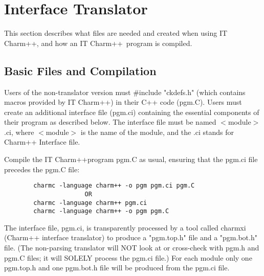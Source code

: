 \newcommand{\ITC}{Interface Translator} 
\newcommand{\itc}{IT Charm++} 

\newcommand{\BE}{\begin{enumerate}}
\newcommand{\EE}{\end{enumerate}}
\newcommand{\BC}{\begin{center}}
\newcommand{\EC}{\end{center}}
\newcommand{\BEQ}{\begin{equation}}
\newcommand{\EEQ}{\end{equation}}
\newcommand{\BI}{\begin{itemize}}
\newcommand{\EI}{\end{itemize}}
\newcommand{\BF}{\begin{figure}}
\newcommand{\EF}{\end{figure}}
\newcommand{\BT}{\begin{tabbing}}
\newcommand{\ET}{\end{tabbing}}
\newcommand{\BAR}{\begin{array}}
\newcommand{\EAR}{\end{array}}
\newcommand{\BV}{\begin{verbatim}}
\newcommand{\EV}{\end{verbatim}}


\section[Interface Translator]{Interface Translator}
\label{Interface Translator}

This section describes what files are needed and created
when using \itc, and how an \itc\ program is compiled.

\subsection{Basic Files and Compilation}

Users of the non-translator version must \#include "ckdefs.h"
(which contains macros provided by \itc)
in their C++ code (pgm.C).
Users must create an additional
interface file (pgm.ci) containing the essential components of
their program as described below.  The interface file must be
named $<$module$>$.ci, where $<$module$>$ is the name of the module, and
the .ci stands for Charm++ Interface file.

Compile the \itc program pgm.C as usual, ensuring that the
pgm.ci file precedes the pgm.C file:
\begin{verbatim}
        charmc -language charm++ -o pgm pgm.ci pgm.C
                      OR
        charmc -language charm++ pgm.ci
        charmc -language charm++ -o pgm pgm.C
\end{verbatim}
The interface file, pgm.ci, is transparently processed by a tool
called charmxi (Charm++ interface translator) to produce a
"pgm.top.h" file and a "pgm.bot.h" file.
(The non-parsing
translator will NOT look at or cross-check with pgm.h and pgm.C
files; it will SOLELY process the pgm.ci file.)
For each module only one pgm.top.h and one pgm.bot.h file will be
produced from the pgm.ci file.

